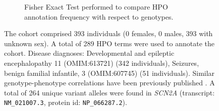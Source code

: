 
\begin{figure}[htbp]\ContinuedFloat
\begin{subfigure}[b]{0.95\textwidth}
\centering
{}
\captionsetup{justification=raggedright,singlelinecheck=false}
\caption{Fisher Exact Test performed to compare HPO annotation frequency with respect to genotypes.}
\end{subfigure}

\vspace{2em}

\caption{ The cohort comprised 393 individuals (0 females, 0 males, 393 with unknown sex). A total of 289 HPO terms were used to annotate the cohort. Disease diagnoses: Developmental and epileptic encephalopathy 11 (OMIM:613721) (342 individuals), Seizures, benign familial infantile, 3 (OMIM:607745) (51 individuals). Similar genotype-phenotype correlations have been previously published \cite{PMID_31904126}. A total of 264 unique variant alleles were found in \textit{SCN2A} (transcript: \texttt{NM\_021007.3}, protein id: \texttt{NP\_066287.2}).}
\end{figure}
